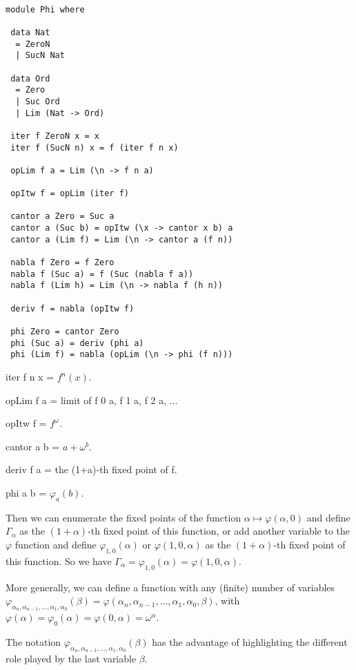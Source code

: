 \documentclass[10pt]{article}
\begin{document}
\begin{verbatim}

module Phi where
 
 data Nat 
  = ZeroN 
  | SucN Nat

 data Ord 
  = Zero 
  | Suc Ord 
  | Lim (Nat -> Ord)

 iter f ZeroN x = x
 iter f (SucN n) x = f (iter f n x)

 opLim f a = Lim (\n -> f n a)

 opItw f = opLim (iter f)

 cantor a Zero = Suc a
 cantor a (Suc b) = opItw (\x -> cantor x b) a
 cantor a (Lim f) = Lim (\n -> cantor a (f n))

 nabla f Zero = f Zero
 nabla f (Suc a) = f (Suc (nabla f a))
 nabla f (Lim h) = Lim (\n -> nabla f (h n))

 deriv f = nabla (opItw f)

 phi Zero = cantor Zero
 phi (Suc a) = deriv (phi a)
 phi (Lim f) = nabla (opLim (\n -> phi (f n)))

\end{verbatim}

iter f n x = \( f^n(x) \).

opLim f a = limit of f 0 a, f 1 a, f 2 a, ...

opItw f = \( f^\omega \).

cantor a b = \( a + \omega^b \).

deriv f a = the (1+a)-th fixed point of f.

phi a b = \( \varphi_a(b) \).

\bigskip
 
Then we can enumerate the fixed points of the function \( \alpha \mapsto \varphi(\alpha,0) \) and define \( \Gamma_\alpha \) as the \( (1+\alpha) \)-th fixed point of this function, or add another variable to the \( \varphi \) function 
and define \( \varphi_{1,0}(\alpha) \) or \( \varphi(1,0,\alpha) \) as the \( (1+\alpha) \)-th fixed point of this function. So we have \( \Gamma_\alpha = \varphi_{1,0}(\alpha) = \varphi(1,0,\alpha) \).

More generally, we can define a function with any (finite) number of variables \( \varphi_{\alpha_n,\alpha_{n-1},\ldots,\alpha_1,\alpha_0}(\beta) = \varphi(\alpha_n, \alpha_{n-1}, \ldots, \alpha_1, \alpha_0, \beta) \), with \( \varphi(\alpha) = \varphi_0(\alpha) = \varphi(0,\alpha) = \omega^\alpha \). 

The notation \( \varphi_{\alpha_n,\alpha_{n-1},\ldots,\alpha_1,\alpha_0}(\beta) \) has the advantage of highlighting the different role played by the last variable \( \beta \).
\end{document}
